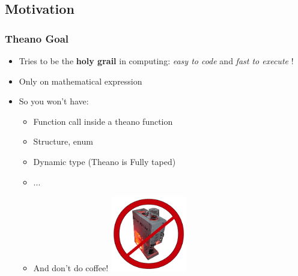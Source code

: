 \documentclass[a4paper,9pt]{beamer}
\begin{document}
\subsection{Motivation}
\begin{frame}
  \frametitle{Theano Goal}
\begin{itemize}
\item Tries to be the {\bf holy grail} in computing: {\it easy to code} and {\it fast to execute} !
\item Only on mathematical expression
\item So you won't have:
  \begin{itemize}
  \item Function call inside a theano function
  \item Structure, enum
  \item Dynamic type (Theano is Fully taped)
  \item ...
  \item And don't do coffee! \includegraphics[width=1.3in]{pics/Caffeine_Machine_no_background_red.png}
  \end{itemize}
\end{itemize}
\end{frame}

\end{document}

